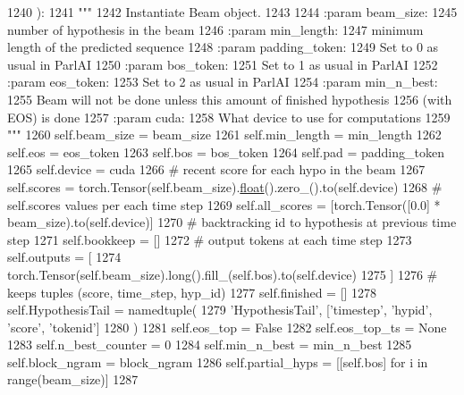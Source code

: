\begin{DoxyCode}
1240     ):
1241         \textcolor{stringliteral}{"""}
1242 \textcolor{stringliteral}{        Instantiate Beam object.}
1243 \textcolor{stringliteral}{}
1244 \textcolor{stringliteral}{        :param beam\_size:}
1245 \textcolor{stringliteral}{            number of hypothesis in the beam}
1246 \textcolor{stringliteral}{        :param min\_length:}
1247 \textcolor{stringliteral}{            minimum length of the predicted sequence}
1248 \textcolor{stringliteral}{        :param padding\_token:}
1249 \textcolor{stringliteral}{            Set to 0 as usual in ParlAI}
1250 \textcolor{stringliteral}{        :param bos\_token:}
1251 \textcolor{stringliteral}{            Set to 1 as usual in ParlAI}
1252 \textcolor{stringliteral}{        :param eos\_token:}
1253 \textcolor{stringliteral}{            Set to 2 as usual in ParlAI}
1254 \textcolor{stringliteral}{        :param min\_n\_best:}
1255 \textcolor{stringliteral}{            Beam will not be done unless this amount of finished hypothesis}
1256 \textcolor{stringliteral}{            (with EOS) is done}
1257 \textcolor{stringliteral}{        :param cuda:}
1258 \textcolor{stringliteral}{            What device to use for computations}
1259 \textcolor{stringliteral}{        """}
1260         self.beam\_size = beam\_size
1261         self.min\_length = min\_length
1262         self.eos = eos\_token
1263         self.bos = bos\_token
1264         self.pad = padding\_token
1265         self.device = cuda
1266         \textcolor{comment}{# recent score for each hypo in the beam}
1267         self.scores = torch.Tensor(self.beam\_size).\hyperlink{namespaceprojects_1_1controllable__dialogue_1_1make__control__dataset_aa2b7207688c641dbc094ab44eca27113}{float}().zero\_().to(self.device)
1268         \textcolor{comment}{# self.scores values per each time step}
1269         self.all\_scores = [torch.Tensor([0.0] * beam\_size).to(self.device)]
1270         \textcolor{comment}{# backtracking id to hypothesis at previous time step}
1271         self.bookkeep = []
1272         \textcolor{comment}{# output tokens at each time step}
1273         self.outputs = [
1274             torch.Tensor(self.beam\_size).long().fill\_(self.bos).to(self.device)
1275         ]
1276         \textcolor{comment}{# keeps tuples (score, time\_step, hyp\_id)}
1277         self.finished = []
1278         self.HypothesisTail = namedtuple(
1279             \textcolor{stringliteral}{'HypothesisTail'}, [\textcolor{stringliteral}{'timestep'}, \textcolor{stringliteral}{'hypid'}, \textcolor{stringliteral}{'score'}, \textcolor{stringliteral}{'tokenid'}]
1280         )
1281         self.eos\_top = \textcolor{keyword}{False}
1282         self.eos\_top\_ts = \textcolor{keywordtype}{None}
1283         self.n\_best\_counter = 0
1284         self.min\_n\_best = min\_n\_best
1285         self.block\_ngram = block\_ngram
1286         self.partial\_hyps = [[self.bos] \textcolor{keywordflow}{for} i \textcolor{keywordflow}{in} range(beam\_size)]
1287 
\end{DoxyCode}


